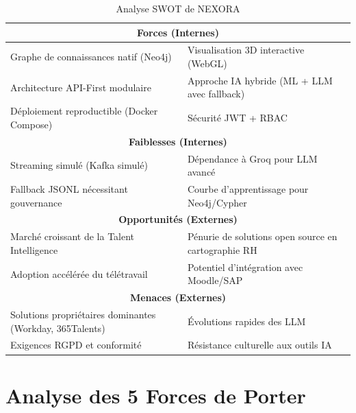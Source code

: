 \documentclass[12pt,a4paper]{report}
\begin{document}
\begin{table}[H]
\centering
\caption{Analyse SWOT de NEXORA}
\label{tab:swot}
\begin{tabular}{p{6cm} p{8.5cm}}
\toprule
\multicolumn{2}{c}{\textbf{Forces (Internes)}} \\
\midrule
Graphe de connaissances natif (Neo4j) & Visualisation 3D interactive (WebGL) \\
Architecture API-First modulaire & Approche IA hybride (ML + LLM avec fallback) \\
Déploiement reproductible (Docker Compose) & Sécurité JWT + RBAC \\
\midrule
\multicolumn{2}{c}{\textbf{Faiblesses (Internes)}} \\
\midrule
Streaming simulé (Kafka simulé) & Dépendance à Groq pour LLM avancé \\
Fallback JSONL nécessitant gouvernance & Courbe d'apprentissage pour Neo4j/Cypher \\
\midrule
\multicolumn{2}{c}{\textbf{Opportunités (Externes)}} \\
\midrule
Marché croissant de la Talent Intelligence & Pénurie de solutions open source en cartographie RH \\
Adoption accélérée du télétravail & Potentiel d'intégration avec Moodle/SAP \\
\midrule
\multicolumn{2}{c}{\textbf{Menaces (Externes)}} \\
\midrule
Solutions propriétaires dominantes (Workday, 365Talents) & Évolutions rapides des LLM \\
Exigences RGPD et conformité & Résistance culturelle aux outils IA \\
\bottomrule
\end{tabular}
\end{table}

\section{Analyse des 5 Forces de Porter}
\end{document}
